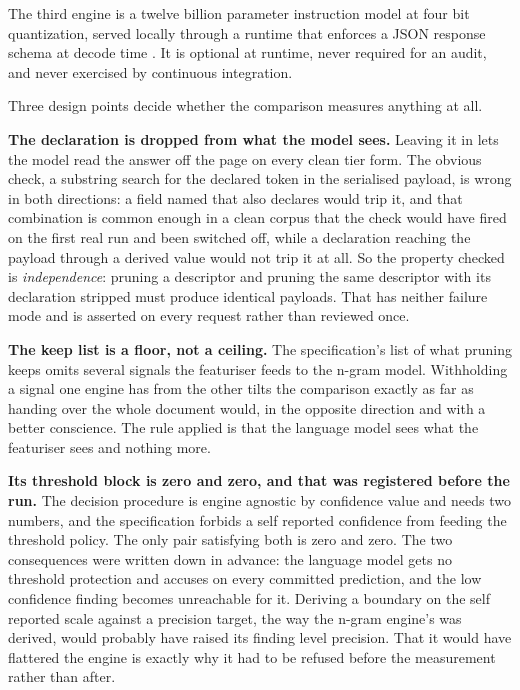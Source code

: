The third engine is a twelve billion parameter instruction model at four bit
quantization, served locally through a runtime that enforces a JSON response
schema at decode time \cite{ollama-api}. It is optional at runtime, never
required for an audit, and never exercised by continuous integration.

\begin{table}[htbp]
  \centering
  \caption{What each engine says about itself. A run log records this block,
  because a comparison table that named neither the model tag nor the
  quantization would not say what it had measured.}
  \label{tab:engine-describe}
  
\end{table}

Three design points decide whether the comparison measures anything at all.

\textbf{The declaration is dropped from what the model sees.} Leaving it in lets
the model read the answer off the page on every clean tier form. The obvious
check, a substring search for the declared token in the serialised payload, is
wrong in both directions: a field named  that also declares
 would trip it, and that combination is common enough
in a clean corpus that the check would have fired on the first real run and been
switched off, while a declaration reaching the payload through a derived value
would not trip it at all. So the property checked is \emph{independence}: pruning
a descriptor and pruning the same descriptor with its declaration stripped must
produce identical payloads. That has neither failure mode and is asserted on
every request rather than reviewed once.

\textbf{The keep list is a floor, not a ceiling.} The specification's list of
what pruning keeps omits several signals the featuriser feeds to the n-gram
model. Withholding a signal one engine has from the other tilts the comparison
exactly as far as handing over the whole document would, in the opposite
direction and with a better conscience. The rule applied is that the language
model sees what the featuriser sees and nothing more.

\textbf{Its threshold block is zero and zero, and that was registered before the
run.} The decision procedure is engine agnostic by confidence value and needs
two numbers, and the specification forbids a self reported confidence from
feeding the threshold policy. The only pair satisfying both is zero and zero.
The two consequences were written down in advance: the language model gets no
threshold protection and accuses on every committed prediction, and the low
confidence finding becomes unreachable for it. Deriving a boundary on the self
reported scale against a precision target, the way the n-gram engine's was
derived, would probably have raised its finding level precision. That it would
have flattered the engine is exactly why it had to be refused before the
measurement rather than after.
